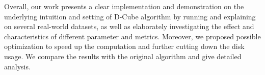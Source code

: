 Overall, our work presents a clear implementation and demonstration on the underlying intuition and setting of D-Cube algorithm by running and explaining on several real-world datasets, as well as elaborately investigating the effect and characteristics of different parameter and metrics. Moreover, we proposed possible optimization to speed up the computation and further cutting down the disk usage. We compare the results with the original algorithm and give detailed analysis.     
\eit
